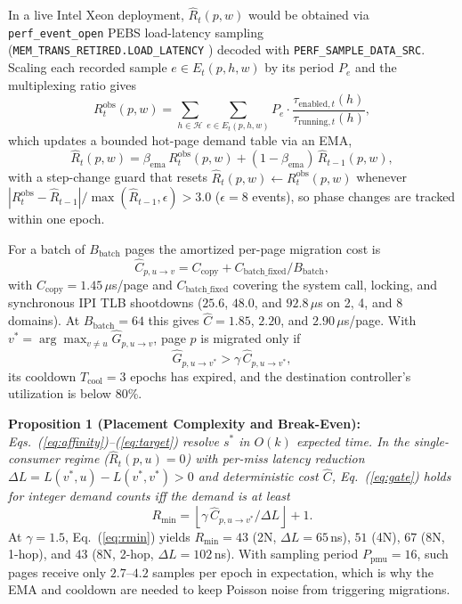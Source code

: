 \documentclass[10pt,twocolumn,letterpaper]{article}
\begin{document}
In a live Intel Xeon deployment, $\widehat{R}_t(p,w)$ would be obtained via \texttt{perf\_event\_open} \cite{ref28} PEBS load-latency sampling (\texttt{MEM\_TRANS\_RETIRED.LOAD\_LATENCY} \cite{ref29}) decoded with \texttt{PERF\_SAMPLE\_DATA\_SRC}. Scaling each recorded sample $e \in E_t(p,h,w)$ by its period $P_e$ and the multiplexing ratio gives
\begin{equation}
R_t^{\mathrm{obs}}(p,w) = \sum_{h \in \mathcal{H}} \sum_{e \in E_t(p,h,w)} P_e \cdot \frac{\tau_{\mathrm{enabled},t}(h)}{\tau_{\mathrm{running},t}(h)},
\label{eq:robs}
\end{equation}
which updates a bounded hot-page demand table via an EMA,
\begin{equation}
\widehat{R}_t(p,w) = \beta_{\mathrm{ema}}\,R_t^{\mathrm{obs}}(p,w) + (1 - \beta_{\mathrm{ema}})\,\widehat{R}_{t-1}(p,w),
\label{eq:ema}
\end{equation}
with a step-change guard that resets $\widehat{R}_t(p,w) \leftarrow R_t^{\mathrm{obs}}(p,w)$ whenever $|R_t^{\mathrm{obs}} - \widehat{R}_{t-1}| / \max(\widehat{R}_{t-1}, \epsilon) > 3.0$ ($\epsilon = 8$ events), so phase changes are tracked within one epoch.

For a batch of $B_{\mathrm{batch}}$ pages the amortized per-page migration cost is
\begin{equation}
\widehat{C}_{p,u\to v} = C_{\mathrm{copy}} + C_{\mathrm{batch\_fixed}}/B_{\mathrm{batch}},
\label{eq:cost}
\end{equation}
with $C_{\mathrm{copy}} = 1.45\,\mu$s/page and $C_{\mathrm{batch\_fixed}}$ covering the system call, locking, and synchronous IPI TLB shootdowns \cite{ref30} ($25.6$, $48.0$, and $92.8\,\mu$s on 2, 4, and 8 domains). At $B_{\mathrm{batch}} = 64$ this gives $\widehat{C} = 1.85$, $2.20$, and $2.90\,\mu$s/page. With $v^* = \arg\max_{v \ne u} \widehat{G}_{p,u\to v}$, page $p$ is migrated only if
\begin{equation}
\widehat{G}_{p,u\to v^*} > \gamma\,\widehat{C}_{p,u\to v^*},
\label{eq:gate}
\end{equation}
its cooldown $T_{\mathrm{cool}} = 3$ epochs has expired, and the destination controller's utilization is below 80\%.

\noindent\textbf{Proposition 1 (Placement Complexity and Break-Even):} \textit{Eqs.~(\ref{eq:affinity})--(\ref{eq:target}) resolve $s^*$ in $O(k)$ expected time. In the single-consumer regime ($\widehat{R}_t(p,u)=0$) with per-miss latency reduction $\Delta L = L(v^*,u) - L(v^*,v^*) > 0$ and deterministic cost $\widehat{C}$, Eq.~(\ref{eq:gate}) holds for integer demand counts iff the demand is at least}
\begin{equation}
R_{\min} = \left\lfloor \gamma\,\widehat{C}_{p,u\to v^*} / \Delta L \right\rfloor + 1.
\label{eq:rmin}
\end{equation}
At $\gamma = 1.5$, Eq.~(\ref{eq:rmin}) yields $R_{\min} = 43$ (2N, $\Delta L = 65$\,ns), $51$ (4N), $67$ (8N, 1-hop), and $43$ (8N, 2-hop, $\Delta L = 102$\,ns). With sampling period $P_{\mathrm{pmu}}=16$, such pages receive only $2.7$--$4.2$ samples per epoch in expectation, which is why the EMA and cooldown are needed to keep Poisson noise from triggering migrations.
\end{document}
